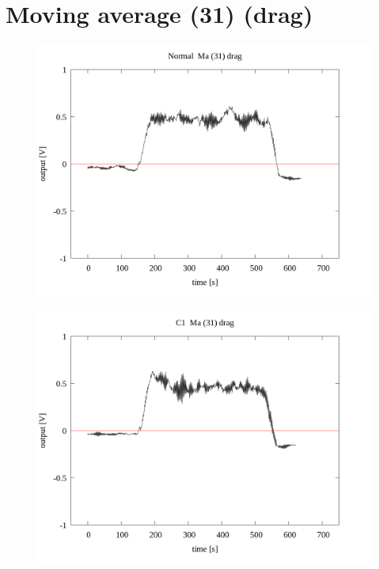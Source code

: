 \documentclass[a4paper]{jsarticle}
\author{}
\title{}
\date{}
\begin{document}
\section{Moving average (31) (drag)}

\begin{figure}[htbp]
    \footnotesize
    \begin{center}
        \includegraphics[width=140mm]{../../../33_result/210806/moving_average/31/drag/Normal_ma(31)_drag.png}
    \end{center}
\end{figure}

\begin{figure}[htbp]
    \footnotesize
    \begin{center}
        \includegraphics[width=140mm]{../../../33_result/210806/moving_average/31/drag/C1_ma(31)_drag.png}
    \end{center}
\end{figure}
\end{document}
